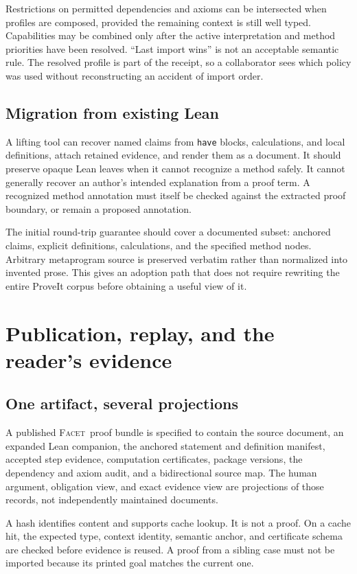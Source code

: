 \documentclass[11pt,a4paper]{article}
\newcommand{\code}[1]{\nolinkurl{#1}}
\newcommand{\Facet}{\textsc{Facet}}
\theoremstyle{definition}
\begin{document}
Restrictions on permitted dependencies and axioms can be intersected when profiles
are composed, provided the remaining context is still well typed. Capabilities
may be combined only after the active interpretation and method priorities have
been resolved. ``Last import wins'' is not an acceptable semantic rule. The
resolved profile is part of the receipt, so a collaborator sees which policy was
used without reconstructing an accident of import order.

\subsection{Migration from existing Lean}
A lifting tool can recover named claims from \code{have} blocks, calculations,
and local definitions, attach retained evidence, and render them as a document.
It should preserve opaque Lean leaves when it cannot recognize a method safely.
It cannot generally recover an author's intended explanation from a proof term.
A recognized method annotation must itself be checked against the extracted
proof boundary, or remain a proposed annotation.

The initial round-trip guarantee should cover a documented subset: anchored
claims, explicit definitions, calculations, and the specified method nodes.
Arbitrary metaprogram source is preserved verbatim rather than normalized into
invented prose. This gives an adoption path that does not require rewriting the
entire ProveIt corpus before obtaining a useful view of it.

\section{Publication, replay, and the reader's evidence}\label{sec:replay}
\subsection{One artifact, several projections}
A published \Facet\ proof bundle is specified to contain the source document, an expanded Lean companion,
the anchored statement and definition manifest, accepted step evidence, computation
certificates, package versions, the dependency and axiom audit, and a bidirectional
source map. The human argument, obligation view, and exact evidence view are
projections of those records, not independently maintained documents.

A hash identifies content and supports cache lookup. It is not a proof. On a
cache hit, the expected type, context identity, semantic anchor, and certificate
schema are checked before evidence is reused. A proof from a sibling case must
not be imported because its printed goal matches the current one.
\end{document}
